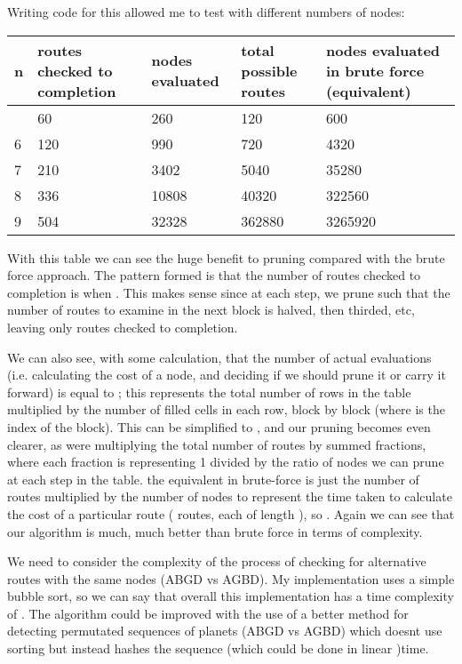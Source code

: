 \documentclass[
]{article}
\begin{document}
Writing code for this allowed me to test with different numbers of
nodes:

\begin{longtable}[]{@{}lllll@{}}
\toprule\noalign{}
n & routes checked to completion & nodes evaluated & total possible
routes & nodes evaluated in brute force (equivalent) \\
\midrule\noalign{}
\endhead
\bottomrule\noalign{}
\endlastfoot
5 & 60 & 260 & 120 & 600 \\
6 & 120 & 990 & 720 & 4320 \\
7 & 210 & 3402 & 5040 & 35280 \\
8 & 336 & 10808 & 40320 & 322560 \\
9 & 504 & 32328 & 362880 & 3265920 \\
\end{longtable}

With this table we can see the huge benefit to pruning compared with the
brute force approach. The pattern formed is that the number of routes
checked to completion is {} when {}. This makes sense since at each
step, we prune such that the number of routes to examine in the next
block is halved, then thirded, etc, leaving only {} routes checked to
completion.

We can also see, with some calculation, that the number of actual
evaluations (i.e. calculating the cost of a node, and deciding if we
should prune it or carry it forward) is equal to {}; this represents the
total number of rows in the table multiplied by the number of filled
cells in each row, block by block (where {} is the index of the block).
This can be simplified to {}, and our pruning becomes even clearer, as
we\textquotesingle re multiplying the {} total number of routes by
summed fractions, where each fraction is representing 1 divided by the
ratio of nodes we can prune at each step in the table. the equivalent in
brute-force is just the number of routes multiplied by the number of
nodes to represent the time taken to calculate the cost of a particular
route ({} routes, each of length {}), so {}. Again we can see that our
algorithm is much, much better than brute force in terms of complexity.

We need to consider the complexity of the process of checking for
alternative routes with the same nodes
(\textquotesingle ABGD\textquotesingle{} vs
\textquotesingle AGBD\textquotesingle). My implementation uses a simple
{} bubble sort, so we can say that overall this implementation has a
time complexity of {}. The algorithm could be improved with the use of a
better method for detecting permutated sequences of planets (ABGD vs
AGBD) which doesn\textquotesingle t use sorting but instead hashes the
sequence (which could be done in linear {} )time.
\end{document}
